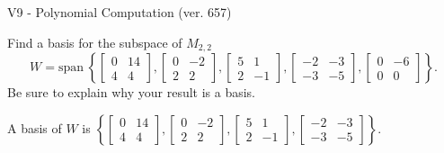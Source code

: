 \begin{exercise}
  \begin{exerciseTitle}V9 - Polynomial Computation (ver. 657)\end{exerciseTitle}
  \begin{exerciseStatement}
    Find a basis for the subspace of \(M_{2,2}\) 
\[W=\mathrm{span}\ \left\{\left[\begin{array}{cc}
0 & 14 \\
4 & 4
\end{array}\right] , \left[\begin{array}{cc}
0 & -2 \\
2 & 2
\end{array}\right] , \left[\begin{array}{cc}
5 & 1 \\
2 & -1
\end{array}\right] , \left[\begin{array}{cc}
-2 & -3 \\
-3 & -5
\end{array}\right] , \left[\begin{array}{cc}
0 & -6 \\
0 & 0
\end{array}\right]\right\}.\]
 Be sure to explain why your result is a basis.


  \end{exerciseStatement}
  \begin{exerciseAnswer}
   A basis of \(W\) is  \(\left\{\left[\begin{array}{cc}
0 & 14 \\
4 & 4
\end{array}\right] , \left[\begin{array}{cc}
0 & -2 \\
2 & 2
\end{array}\right] , \left[\begin{array}{cc}
5 & 1 \\
2 & -1
\end{array}\right] , \left[\begin{array}{cc}
-2 & -3 \\
-3 & -5
\end{array}\right]\right\}\).
  


  \end{exerciseAnswer}
\end{exercise}